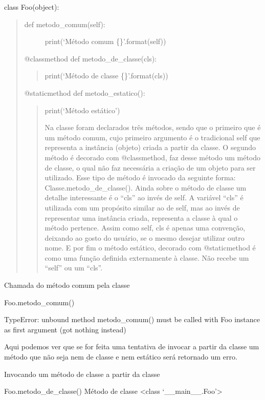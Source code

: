 \documentclass[letterpaper,10pt,brazil]{sphinxmanual}
\begin{document}
class Foo(object):
\begin{quote}
\begin{description}
\item[{def metodo\_comum(self):}] \leavevmode
print(‘Método comum \{\}’.format(self))

\end{description}

@classmethod
def metodo\_de\_classe(cls):
\begin{quote}

print(‘Método de classe \{\}’.format(cls))
\end{quote}

@staticmethod
def metodo\_estatico():
\begin{quote}

print(‘Método estático’)

Na classe foram declarados três métodos, sendo que o primeiro que é um método comum, cujo primeiro argumento é o tradicional self que representa a instância (objeto) criada a partir da classe.
O segundo método é decorado com @classmethod, faz desse método um método de classe, o qual não faz necessária a criação de um objeto para ser utilizado. Esse tipo de método é invocado da seguinte forma: Classe.metodo\_de\_classe(). Ainda sobre o método de classe um detalhe interessante é o “cls” ao invés de self. A variável “cls” é utilizada com um propósito similar ao de self, mas ao invés de representar uma instância criada, representa a classe à qual o método pertence. Assim como self, cls é apenas uma convenção, deixando ao gosto do usuário, se o mesmo desejar utilizar outro nome.
E por fim o método estático, decorado com @staticmethod é como uma função definida externamente à classe. Não recebe um “self” ou um “cls”.
\end{quote}
\end{quote}

Chamada do método comum pela classe

Foo.metodo\_comum()

TypeError: unbound method metodo\_comum() must be called with Foo instance as first argument (got nothing instead)

Aqui podemos ver que se for feita uma tentativa de invocar a partir da classe um método que não seja nem de classe e nem estático será retornado um erro.

Invocando um método de classe a partir da classe

Foo.metodo\_de\_classe()
Método de classe \textless{}class ‘\_\_main\_\_.Foo’\textgreater{}
\end{document}
